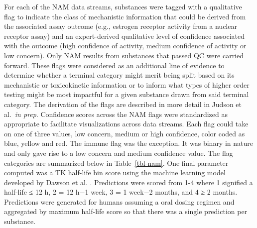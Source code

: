 \documentclass[
  super,
  preprint,
  3p]{elsarticle}
\begin{document}
For each of the NAM data streams, substances were tagged with a
qualitative flag to indicate the class of mechanistic information that
could be derived from the associated assay outcome (e.g., estrogen
receptor activity from a nuclear receptor assay) and an expert-derived
qualitative level of confidence associated with the outcome (high
confidence of activity, medium confidence of activity or low concern).
Only NAM results from substances that passed QC were carried forward.
These flags were considered as an additional line of evidence to
determine whether a terminal category might merit being split based on
its mechanistic or toxicokinetic information or to inform what types of
higher order testing might be most impactful for a given substance drawn
from said terminal category. The derivation of the flags are described
in more detail in Judson et al.~\emph{in prep}. Confidence scores across
the NAM flags were standardized as appropriate to facilitate
visualizations across data streams. Each flag could take on one of three
values, low concern, medium or high confidence, color coded as blue,
yellow and red. The immune flag was the exception. It was binary in
nature and only gave rise to a low concern and medium confidence value.
The flag categories are summarized below in Table~\ref{tbl-nam}. One
final parameter computed was a TK half-life bin score using the machine
learning model developed by Dawson et al. \citep{dawson_2023}.
Predictions were scored from 1-4 where 1 signified a half-life ≤ 12 h, 2
= 12 h−1 week, 3 = 1 week−2 months, and 4 ≥ 2 months. Predictions were
generated for humans assuming a oral dosing regimen and aggregated by
maximum half-life score so that there was a single prediction per
substance.
\end{document}
